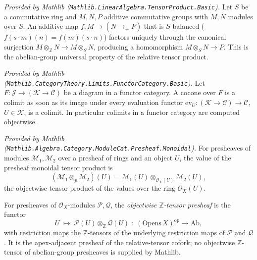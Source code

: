 \begin{lemma}
  \label{lem:tensorProduct_liftAddHom_mathlib}
  \mathlibok
  \textit{Provided by Mathlib (\texttt{Mathlib.LinearAlgebra.TensorProduct.Basic}).}
  Let \(S\) be a commutative ring and \(M, N, P\) additive commutative groups with
  \(M, N\) modules over \(S\). An additive map \(f : M \to (N \to_{+} P)\) that is
  \(S\)-balanced (\(f(s \cdot m)(n) = f(m)(s \cdot n)\)) factors uniquely through
  the canonical surjection \(M \otimes_{\mathbb{Z}} N \to M \otimes_S N\),
  producing a homomorphism \(M \otimes_S N \to P\). This is the abelian-group
  universal property of the relative tensor product.
\end{lemma}

\begin{lemma}
  \label{lem:evaluationJointlyReflectsColimits_mathlib}
  \mathlibok
  \textit{Provided by Mathlib
  (\texttt{Mathlib.CategoryTheory.Limits.FunctorCategory.Basic}).}
  Let \(F : \mathcal{J} \to (\mathcal{K} \to \mathcal{C})\) be a diagram in a
  functor category. A cocone over \(F\) is a colimit as soon as its image under
  every evaluation functor \(\mathrm{ev}_U : (\mathcal{K} \to \mathcal{C}) \to
  \mathcal{C}\), \(U \in \mathcal{K}\), is a colimit. In particular colimits in a
  functor category are computed objectwise.
\end{lemma}

\begin{lemma}
  \label{lem:presheaf_tensorObj_obj_mathlib}
  \mathlibok
  \textit{Provided by Mathlib
  (\texttt{Mathlib.Algebra.Category.ModuleCat.Presheaf.Monoidal}).}
  For presheaves of modules \(\mathcal{M}_1, \mathcal{M}_2\) over a presheaf of
  rings and an object \(U\), the value of the presheaf monoidal tensor product is
  \[
    (\mathcal{M}_1 \otimes_p \mathcal{M}_2)(U)
      = \mathcal{M}_1(U) \otimes_{\mathcal{O}_X(U)} \mathcal{M}_2(U),
  \]
  the objectwise tensor product of the values over the ring \(\mathcal{O}_X(U)\).
\end{lemma}

\begin{definition}
  \label{def:relTensorDomainPresheaf}
  For presheaves of \(\mathcal{O}_X\)-modules \(\mathcal{P}, \mathcal{Q}\), the
  \emph{objectwise \(\mathbb{Z}\)-tensor presheaf} is the functor
  \[
    U \;\longmapsto\; \mathcal{P}(U) \otimes_{\mathbb{Z}} \mathcal{Q}(U)
      \;:\; (\mathrm{Opens}\,X)^{\mathrm{op}} \to \mathrm{Ab},
  \]
  with restriction maps the \(\mathbb{Z}\)-tensors of the underlying restriction
  maps of \(\mathcal{P}\) and \(\mathcal{Q}\). It is the apex-adjacent presheaf of
  the relative-tensor cofork; no objectwise \(\mathbb{Z}\)-tensor of
  abelian-group presheaves is supplied by Mathlib.
\end{definition}

